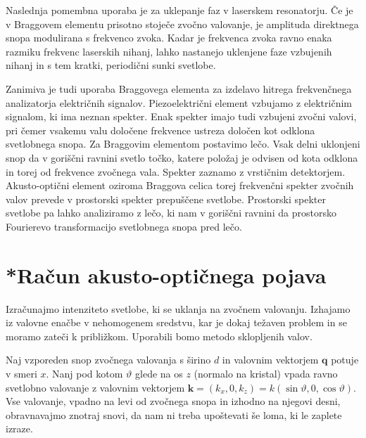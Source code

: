 Naslednja pomembna uporaba je za uklepanje faz
v laserskem resonatorju. Če je v Braggovem elementu prisotno stoječe zvočno
valovanje, je amplituda direktnega snopa modulirana s frekvenco zvoka.
Kadar je frekvenca zvoka ravno enaka razmiku frekvenc laserskih nihanj,
lahko nastanejo uklenjene faze vzbujenih nihanj in s tem kratki, periodični
sunki svetlobe.

Zanimiva je tudi uporaba Braggovega elementa za izdelavo
hitrega frekvenčnega analizatorja električnih signalov.  
Piezoelektrični element vzbujamo z električnim signalom,
ki ima neznan spekter. Enak spekter imajo tudi vzbujeni zvočni valovi, 
pri čemer vsakemu valu določene frekvence ustreza določen kot odklona svetlobnega
snopa. Za Braggovim elementom postavimo lečo. Vsak delni uklonjeni
snop da v goriščni ravnini svetlo točko, katere položaj je odvisen
od kota odklona in torej od frekvence zvočnega vala. Spekter zaznamo
z vrstičnim detektorjem. Akusto-optični element oziroma Braggova celica 
torej frekvenčni spekter zvočnih valov prevede v prostorski
spekter prepuščene svetlobe. Prostorski spekter svetlobe pa lahko
analiziramo z lečo, ki nam v goriščni ravnini da prostorsko
Fourierevo transformacijo svetlobnega snopa pred lečo.

\section{*Račun akusto-optičnega pojava}
Izračunajmo intenziteto svetlobe, ki se uklanja na zvočnem valovanju. Izhajamo 
iz valovne enačbe v nehomogenem sredstvu, kar je dokaj težaven problem
in se moramo zateči k približkom. Uporabili bomo metodo sklopljenih valov. 

Naj vzporeden snop zvočnega valovanja s širino $d$ in valovnim vektorjem $\mathbf{q}$ 
potuje v smeri $x$.
Nanj pod kotom $\vartheta$ glede na os $z$ (normalo na kristal) 
vpada ravno svetlobno valovanje z valovnim vektorjem 
$\mathbf{k}=(k_{x},0,k_{z})= k(\sin\vartheta,0,\cos\vartheta)$.
Vse valovanje, vpadno na levi od zvočnega snopa in izhodno na njegovi desni,
obravnavajmo znotraj snovi, da nam ni treba upoštevati še loma, ki
le zaplete izraze. 

